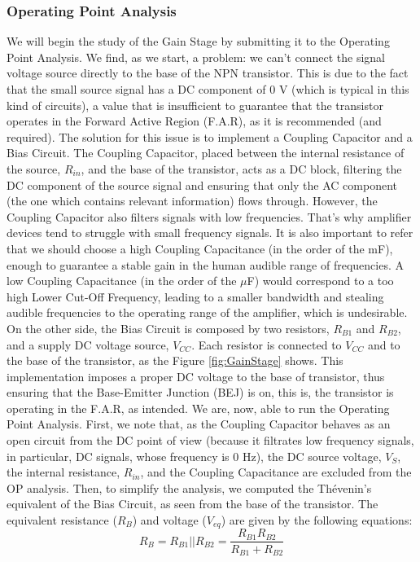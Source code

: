 \subsubsection{Operating Point Analysis}
We will begin the study of the Gain Stage by submitting it to the Operating Point Analysis. We find, as we start, a problem: we can't connect the signal voltage source directly to the base of the NPN transistor. This is due to the fact that the small source signal has a DC component of 0 V (which is typical in this kind of circuits), a value that is insufficient to guarantee that the transistor operates in the Forward Active Region (F.A.R), as it is recommended (and required). The solution for this issue is to implement a Coupling Capacitor and a Bias Circuit.
The Coupling Capacitor, placed between the internal resistance of the source, $R_{in}$, and the base of the transistor, acts as a DC block, filtering the DC component of the source signal and ensuring that only the AC component (the one which contains relevant information) flows through. However, the Coupling Capacitor also filters signals with low frequencies. That's why amplifier devices tend to struggle with small frequency signals. It is also important to refer that we should choose a high Coupling Capacitance (in the order of the mF), enough to guarantee a stable gain in the human audible range of frequencies. A low Coupling Capacitance (in the order of the $\mu$F) would correspond to a too high Lower Cut-Off Frequency, leading to a smaller bandwidth and stealing audible frequencies to the operating range of the amplifier, which is undesirable.
On the other side, the Bias Circuit is composed by two resistors, $R_{B1}$ and $R_{B2}$, and a supply DC voltage source, $V_{CC}$. Each resistor is connected to $V_{CC}$ and to the base of the transistor, as the Figure \ref{fig:GainStage} shows. This implementation imposes a proper DC voltage to the base of transistor, thus ensuring that the Base-Emitter Junction (BEJ) is on, this is, the transistor is operating in the F.A.R, as intended.
We are, now, able to run the Operating Point Analysis.
First, we note that, as the Coupling Capacitor behaves as an open circuit from the DC point of view (because it filtrates low frequency signals, in particular, DC signals, whose frequency is 0 Hz), the DC source voltage, $V_S$, the internal resistance, $R_{in}$, and the Coupling Capacitance are excluded from the OP analysis. Then, to simplify the analysis, we computed the Thévenin's equivalent of the Bias Circuit, as seen from the base of the transistor. The equivalent resistance ($R_B$) and voltage ($V_{eq}$) are given by the following equations:
\begin{equation}
	R_B = R_{B1} || R_{B2} = \frac{R_{B1} R_{B2}}{R_{B1} + R_{B2}}
	\label{eq:RTh}
\end{equation}

